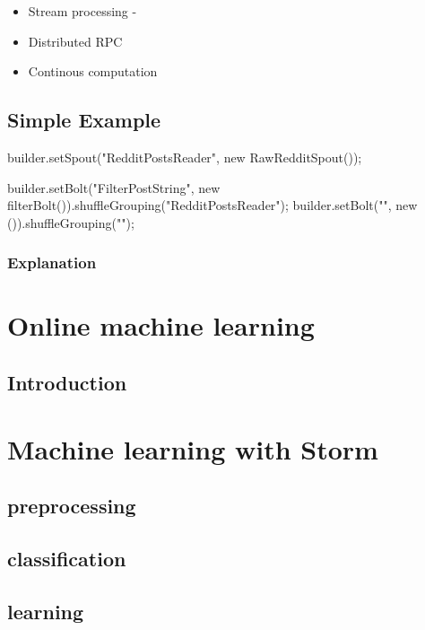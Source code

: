 \documentclass[journal]{IEEEtran/IEEEtran}
\begin{document}
\begin{itemize}
    \item Stream processing - 
    \item Distributed RPC
    \item Continous computation
\end{itemize}

\subsection{Simple Example}

\begin{code}
        builder.setSpout("RedditPostsReader", new RawRedditSpout());

        builder.setBolt("FilterPostString", new filterBolt()).shuffleGrouping("RedditPostsReader");
        builder.setBolt("", new ()).shuffleGrouping("");


\end{code}
\subsubsection*{Explanation}

\section{Online machine learning}

\subsection{Introduction}

\section{Machine learning with Storm}

\subsection{preprocessing}

\subsection{classification}

\subsection{learning}
\end{document}
